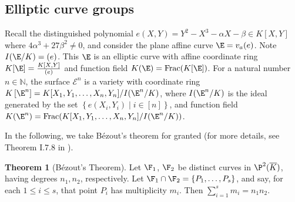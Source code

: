 \documentclass[11pt,letterpaper]{article}
\newcommand{\polys}{K[X,Y]}
\newcommand{\productpolys}{K[X_1, Y_1, \ldots, X_n, Y_n]}
\theoremstyle{definition}
\newtheorem{theorem}{Theorem}[subsection]
\newcommand{\ff}{K(\E)}
\newcommand{\6}{\mathbf}
\newcommand{\7}{\mathcal}
\begin{document}

\subsection{Elliptic curve groups}

Recall the distinguished polynomial $e(X,Y) = Y^2 - X^3 - \alpha X - \beta \in \polys$ where $4\alpha^3 + 27\beta^2 \neq 0$, and consider the plane affine curve $\E = v_a(e)$. Note $I(\E/K) = (e)$. This $\E$ is an elliptic curve with affine coordinate ring $K[\E] = \frac{K[X,Y]}{(e)}$ and function field $K(\E) = \text{Frac}(K[\E])$. 
For a natural number $n \in \mathbb{N}$, the surface $\mathcal{E}^n$ is a variety with coordinate ring $K\left[\E^n\right] = \productpolys/I(\E^n/K)$, where $I(\E^n/K)$ is the ideal generated by the set $\left\{e(X_i, Y_i) \mid i \in [n]\right\}$, and function field $K(\E^n) = \text{Frac}(\productpolys/I(\E^n/K))$.

In the following, we take B\'{e}zout's theorem for granted (for more details, see Theorem I.7.8 in \cite{Hartshorne}).
\begin{theorem}[{B}{\'{e}}zout's {T}heorem]
Let $\F_1$, $\F_2$ be distinct curves in $\P^2(\overline{K})$, having 
degrees $n_1, n_2$, respectively. Let $\F_1 \cap \F_2 = \left\{P_1, \ldots, P_s\right\}$, and say, for each $1 \leq i \leq s$, that point $P_i$ has multiplicity $m_i$. Then $\sum_{i=1}^{s} m_i = n_1n_2$. 
\end{theorem}
\end{document}
